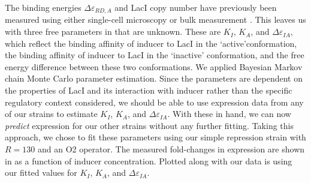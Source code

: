 The binding energies $\Delta \varepsilon_{RD,A}$ and LacI copy number have
previously been measured using either single-cell microscopy or bulk measurement
\cite{Oehler1994,Vilar2003,Garcia2011, Brewster2014}. This leaves us with three
free parameters in \eref[eq7] that are unknown. These are $K_I$, $K_A$, and
$\Delta\varepsilon_{IA}$, which reflect the binding affinity of inducer to LacI in the
\lq active\rq conformation, the binding affinity of inducer to LacI in the \lq inactive\rq
conformation, and the free energy difference between these two conformations. We
applied Bayesian Markov chain Monte Carlo parameter estimation. Since the parameters are dependent on the
properties of LacI and its interaction with inducer rather than the
specific regulatory context considered, we should be able to use expression data
from any of our strains to estimate $K_I$, $K_A$, and $\Delta\varepsilon_{IA}$. With these in hand,
we can now \textit{predict} expression for our other strains without any further fitting. Taking this approach, we chose to fit these parameters using our simple repression strain with $R=130$ and an O2 operator. The measured fold-changes in expression are shown in  as a function of inducer concentration. Plotted along with our data is \eref[eq7] using our fitted values for $K_I$, $K_A$, and $\Delta\varepsilon_{IA}$.



